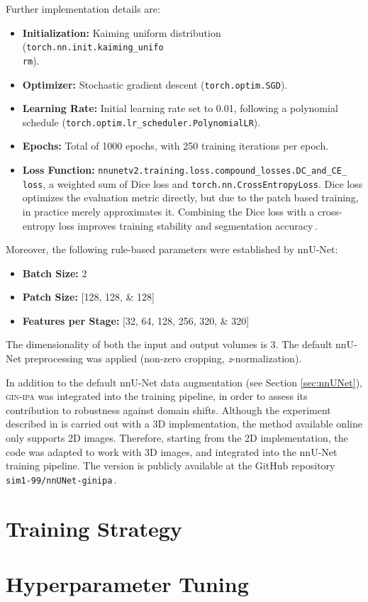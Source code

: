 Further implementation details are:
\begin{itemize}
    \item \textbf{Initialization:} Kaiming uniform distribution (\texttt{torch.nn.init.kaiming\_unifo\\
    rm}).
    \item \textbf{Optimizer:} Stochastic gradient descent (\texttt{torch.optim.SGD}).
    \item \textbf{Learning Rate:} Initial learning rate set to \num{0.01}, following a polynomial schedule (\texttt{torch.optim.lr\_scheduler.PolynomialLR}).
    \item \textbf{Epochs:} Total of \num{1000} epochs, with \num{250} training iterations per epoch.
    \item \textbf{Loss Function:} \texttt{nnunetv2.training.loss.compound\_losses.DC\_and\_CE\_\\
    loss}, a weighted sum of Dice loss and \texttt{torch.nn.CrossEntropyLoss}. Dice loss optimizes the evaluation metric directly, but due to the patch based training, in practice merely approximates it. Combining the Dice loss with a cross-entropy loss improves training stability and segmentation accuracy\,\cite{Isensee2021}.
\end{itemize}

Moreover, the following rule-based parameters were established by nnU-Net:
\begin{itemize}
    \item \textbf{Batch Size:} \num{2}
    \item \textbf{Patch Size:} [\numlist[list-final-separator = {, }]{128;128;128}]
    \item \textbf{Features per Stage:} [\numlist[list-final-separator = {, }]{32;64;128;256;320;320}]
\end{itemize}
The dimensionality of both the input and output volumes is \num{3}. The default nnU-Net preprocessing was applied (non-zero cropping, \textit{z}-normalization).

In addition to the default nnU-Net data augmentation (see Section \ref{sec:nnUNet}), \textsc{gin-ipa} was integrated into the training pipeline, in order to assess its contribution to robustness against domain shifts. Although the experiment described in \cite{Ouyang2023} is carried out with a 3D implementation, the method available online only supports 2D images. Therefore, starting from the 2D implementation, the code was adapted to work with 3D images, and integrated into the nnU-Net training pipeline. The version is publicly available at the GitHub repository \texttt{sim1-99/nnUNet-ginipa}\,\cite{nnUNet-ginipa}.

\section{Training Strategy}

\section{Hyperparameter Tuning}

